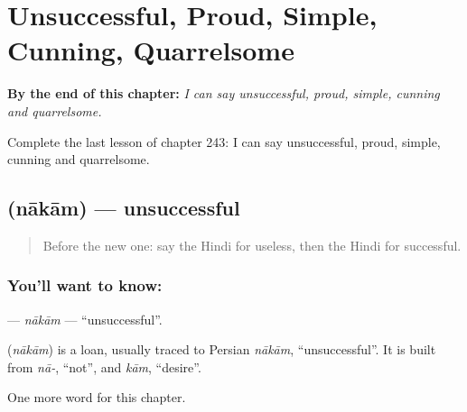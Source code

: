 
\chapter{Unsuccessful, Proud, Simple, Cunning, Quarrelsome}
\label{ch:hi-unsuccessful-proud-simple-cunning-quarrelsome}

\begin{chapteropening}
\textbf{By the end of this chapter:} \emph{I can say unsuccessful, proud, simple, cunning and quarrelsome.}

Complete the last lesson of chapter 243: I can say unsuccessful, proud, simple, cunning and quarrelsome.
\end{chapteropening}

\section[\texorpdfstring{\hi{नाकाम} (nākām)}{नाकाम (nākām)}]{ (nākām) — unsuccessful}

\label{lesson:HI-C243-nakam}



\begin{quote}
Before the new one: say the Hindi for useless, then the Hindi for successful.
\end{quote}

\subsection*{You'll want to know: }
\textbf{} — \emph{nākām} — \textquotedblleft{}unsuccessful\textquotedblright{}.

\begin{cousinweb}
\textbf{} (\emph{nākām}) is a loan, usually traced to Persian \emph{nākām}, \textquotedblleft{}unsuccessful\textquotedblright{}. It is built from \emph{nā-}, \textquotedblleft{}not\textquotedblright{}, and \emph{kām}, \textquotedblleft{}desire\textquotedblright{}.
\end{cousinweb}

\begin{grammarlens}[title={What you've built}]
One more word for this chapter.
\end{grammarlens}

